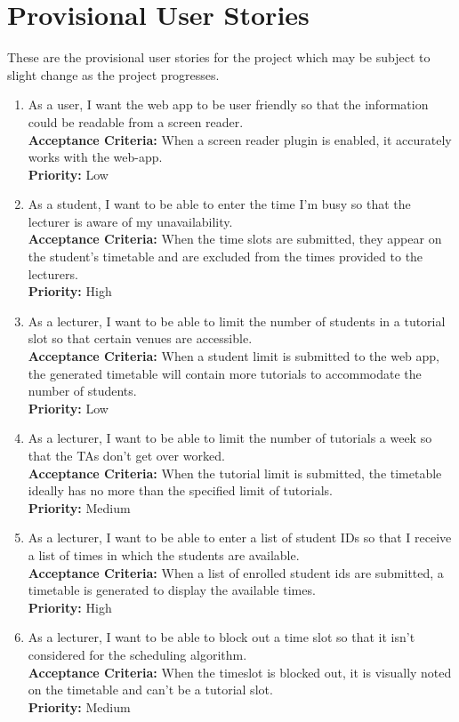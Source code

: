 \section{Provisional User Stories}
These are the provisional user stories for the project which may be subject to slight change as the project progresses.

\begin{enumerate}
\item As a user, I want the web app to be user friendly so that the information could be readable from a screen reader.\\
	\textbf{Acceptance Criteria:} When a screen reader plugin is enabled, it accurately works with the web-app.\\
        \textbf{Priority:} Low 

\item As a student, I want to be able to enter the time I'm busy so that the lecturer is aware of my unavailability.\\
		\textbf{Acceptance Criteria: }When the time slots are submitted, they appear on the student's timetable and are excluded from the times provided to the lecturers.\\
		\textbf{Priority:} High 

\item As a lecturer, I want to be able to limit the number of students in a tutorial slot so that certain venues are accessible.\\
		\textbf{Acceptance Criteria:} When a student limit is submitted to the web app, the generated timetable will contain more tutorials to accommodate the number of students.\\
		\textbf{Priority:} Low

\item As a lecturer, I want to be able to limit the number of tutorials a week so that the TAs don't get over worked.\\
		\textbf{Acceptance Criteria:} When the tutorial limit is submitted, the timetable ideally has no more than the specified limit of tutorials.\\
		\textbf{Priority:} Medium

\item As a lecturer, I want to be able to enter a list of student IDs so that I receive a list of times in which the students are available.\\
		\textbf{Acceptance Criteria:} When a list of enrolled student ids are submitted, a timetable is generated to display the available times.\\
		\textbf{Priority:} High

\item As a lecturer, I want to be able to block out a time slot so that it isn't considered for the scheduling algorithm.\\
		\textbf{Acceptance Criteria:} When the timeslot is blocked out, it is visually noted on the timetable and can't be a tutorial slot.\\
		\textbf{Priority:} Medium
\end{enumerate}

